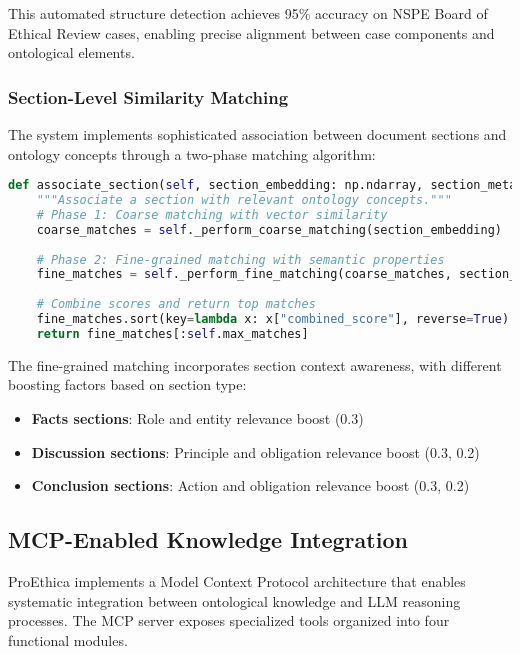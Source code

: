 This automated structure detection achieves 95\% accuracy on NSPE Board of Ethical Review cases, enabling precise alignment between case components and ontological elements.

\subsubsection{Section-Level Similarity Matching}

The system implements sophisticated association between document sections and ontology concepts through a two-phase matching algorithm:

\begin{lstlisting}[language=Python, caption=Section-Concept Association]
def associate_section(self, section_embedding: np.ndarray, section_metadata: Dict[str, Any]) -> List[Dict[str, Any]]:
    """Associate a section with relevant ontology concepts."""
    # Phase 1: Coarse matching with vector similarity
    coarse_matches = self._perform_coarse_matching(section_embedding)
    
    # Phase 2: Fine-grained matching with semantic properties
    fine_matches = self._perform_fine_matching(coarse_matches, section_metadata)
    
    # Combine scores and return top matches
    fine_matches.sort(key=lambda x: x["combined_score"], reverse=True)
    return fine_matches[:self.max_matches]
\end{lstlisting}

The fine-grained matching incorporates section context awareness, with different boosting factors based on section type:

\begin{itemize}
\item \textbf{Facts sections}: Role and entity relevance boost (0.3)
\item \textbf{Discussion sections}: Principle and obligation relevance boost (0.3, 0.2)
\item \textbf{Conclusion sections}: Action and obligation relevance boost (0.3, 0.2)
\end{itemize}

\subsection{MCP-Enabled Knowledge Integration}

ProEthica implements a Model Context Protocol architecture that enables systematic integration between ontological knowledge and LLM reasoning processes. The MCP server exposes specialized tools organized into four functional modules.

